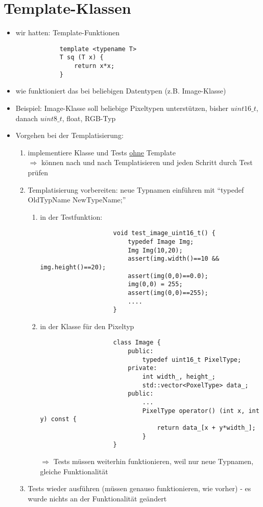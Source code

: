 \documentclass{article}
\begin{document}
\section*{Template-Klassen}
	\begin{itemize}
		\item wir hatten: Template-Funktionen
		\begin{lstlisting}
			template <typename T>
			T sq (T x) {
				return x*x;
			}
		\end{lstlisting}
		\item wie funktioniert das bei beliebigen Datentypen (z.B. Image-Klasse)
		\item Beispiel: Image-Klasse soll beliebige Pixeltypen unterstützen, bisher $uint16\_t$, danach $uint8\_t$, float, RGB-Typ
		\item Vorgehen bei der Templatisierung:
		\begin{enumerate}
			\addtocounter{enumi}{-1}
			\item implementiere Klasse und Tests \underline{ohne} Template \\ $\Rightarrow$ können nach und nach Templatisieren und jeden Schritt durch Test prüfen
			\item Templatisierung vorbereiten: neue Typnamen einführen mit ``typedef OldTypName NewTypeName;''
			\begin{enumerate}
				\item in der Testfunktion:
				\begin{lstlisting}
					void test_image_uint16_t() {
						typedef Image Img;
						Img Img(10,20);
						assert(img.width()==10 && img.height()==20);
						assert(img(0,0)==0.0);
						img(0,0) = 255;
						assert(img(0,0)==255);
						....
					}
				\end{lstlisting}
				\item in der Klasse für den Pixeltyp
				\begin{lstlisting}
					class Image {
						public:
							typedef uint16_t PixelType;
						private:
							int width_, height_;
							std::vector<PoxelType> data_;
						public:
							...
							PixelType operator() (int x, int y) const {
								return data_[x + y*width_];
							}
					}
				\end{lstlisting}
				$\Rightarrow$ Tests müssen weiterhin funktionieren, weil nur neue Typnamen, gleiche Funktionalität
			\end{enumerate}
			\item Tests wieder ausführen (müssen genauso funktionieren, wie vorher) - es wurde nichts an der Funktionalität geändert

\end{enumerate}
\end{itemize}
\end{document}
